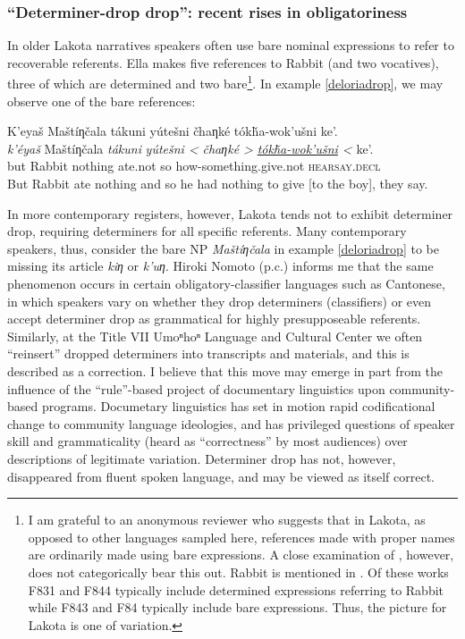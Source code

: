 \documentclass[output=paper]{LSP/langsci}
\begin{document}
\subsubsection{“Determiner-drop drop”: recent rises in obligatoriness}\label{determinerdropdrop}

	In older Lakota narratives speakers often use bare nominal expressions to refer to recoverable referents. Ella \citet[F831]{Deloria1932} makes five references to Rabbit (and two vocatives), three of which are determined and two bare\footnote{I am grateful to an anonymous reviewer who suggests that in Lakota, as opposed to other languages sampled here, references made with proper names are ordinarily made using bare expressions. A close examination of \citet{Deloria1932}, however, does not categorically bear this out. Rabbit is mentioned in \citet[F831, F843, F844 and F847]{Deloria1932}. Of these works F831 and F844 typically include determined expressions referring to Rabbit while F843 and F84 typically include bare expressions. Thus, the picture for Lakota is one of variation.}. In example \ref{deloriadrop}, we may observe one of the bare references:
	
\ea\label{deloriadrop}
	K’eyaš Maštíƞčala tákuni yútešni čhaƞké tókȟa-wok’ušni ke’.\footnotemark\\
\gll	\emph{k’éyaš} 	Maštíƞčala 	\emph{tákuni} 	\emph{yútešni <}	 \emph{čhaƞké >} 	\emph{\underline{tókȟa-wok’ušni} <}		ke’. \\
	but 			Rabbit		nothing	 	ate.not	 	 so 			 how-something.give.not 				\textsc{hearsay.decl}\\
\glt	But Rabbit ate nothing and so he had nothing to give [to the boy], they say.
\z

In more contemporary registers, however, Lakota tends not to exhibit determiner drop, requiring determiners for all specific referents. Many contemporary speakers, thus, consider the bare NP \emph{Maštíƞčala} in example \ref{deloriadrop} to be missing its article \emph{kiƞ} or \emph{k’uƞ}. Hiroki Nomoto (p.c.) informs me that the same phenomenon occurs in certain obligatory-classifier languages such as Cantonese, in which speakers vary on whether they drop determiners (classifiers) or even accept determiner drop as grammatical for highly presupposeable referents. Similarly, at the Title VII Umoⁿhoⁿ Language and Cultural Center we often “reinsert” dropped determiners into transcripts and materials, and this is described as a correction. I believe that this move may emerge in part from the influence of the “rule”-based project of documentary linguistics upon community-based programs. Documetary linguistics has set in motion rapid codificational change to community language ideologies, and has privileged questions of speaker skill and grammaticality (heard as “correctness” by most audiences) over descriptions of legitimate variation. Determiner drop has not, however, disappeared from fluent spoken language, and may be viewed as itself correct.
\end{document}
